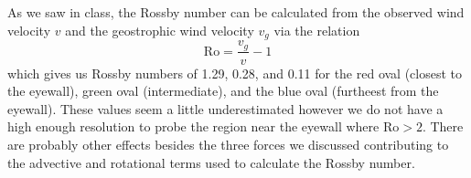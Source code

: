 \documentclass[11pt]{article}
\begin{document}
As we saw in class, the Rossby number can be calculated from the observed wind velocity $v$ and the geostrophic wind velocity $v_g$ via the relation
\begin{equation}
  \mathrm{Ro} = \frac{v_g}{v} - 1
\end{equation}
which gives us Rossby numbers of 1.29, 0.28, and 0.11 for the red oval (closest to the eyewall), green oval (intermediate), and the blue oval (furtheest from the eyewall). These values seem a little underestimated however we do not have a high enough resolution to probe the region near the eyewall where $\mathrm{Ro} > 2$. There are probably other effects besides the three forces we discussed contributing to the advective and rotational terms used to calculate the Rossby number.

\end{document}
